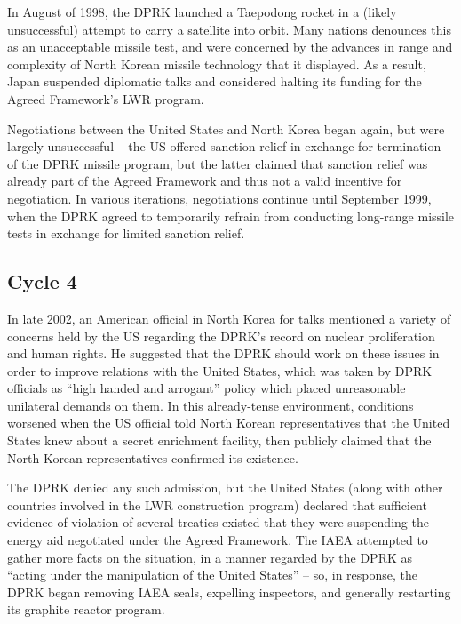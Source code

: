 \documentclass{article}
\begin{document}
In August of 1998, the DPRK launched a Taepodong rocket in a (likely unsuccessful) attempt to carry a satellite into orbit\cite{orfall}. Many nations denounces this as an unacceptable missile test, and were concerned by the advances in range and complexity of North Korean missile technology that it displayed\cite{orfall}. As a result, Japan suspended diplomatic talks and considered halting its funding for the Agreed Framework’s LWR program\cite{orfall}.

Negotiations between the United States and North Korea began again, but were largely unsuccessful – the US offered sanction relief in exchange for termination of the DPRK missile program, but the latter claimed that sanction relief was already part of the Agreed Framework and thus not a valid incentive for negotiation\cite{davenport}. In various iterations, negotiations continue until September 1999, when the DPRK agreed to temporarily refrain from conducting long-range missile tests in exchange for limited sanction relief\cite{davenport}.

\subsection{Cycle 4}

In late 2002, an American official in North Korea for talks mentioned a variety of concerns held by the US regarding the DPRK’s record on nuclear proliferation and human rights\cite{davenport}. He suggested that the DPRK should work on these issues in order to improve relations with the United States, which was taken by DPRK officials as “high handed and arrogant” policy which placed unreasonable unilateral demands on them\cite{kcna3}. In this already-tense environment, conditions worsened when the US official told North Korean representatives that the United States knew about a secret enrichment facility, then publicly claimed that the North Korean representatives confirmed its existence\cite{davenport}. 

The DPRK denied any such admission, but the United States (along with other countries involved in the LWR construction program) declared that sufficient evidence of violation of several treaties existed that they were suspending the energy aid negotiated under the Agreed Framework\cite{iaea09}. The IAEA attempted to gather more facts on the situation, in a manner regarded by the DPRK as “acting under the manipulation of the United States”\cite{hurriyet} – so, in response, the DPRK began removing IAEA seals, expelling inspectors, and generally restarting its graphite reactor program\cite{iaea09}.
\end{document}
